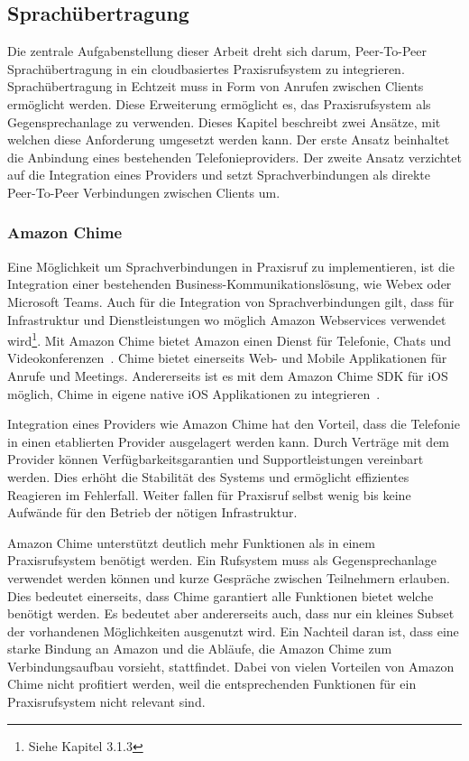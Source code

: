 \subsection{Sprachübertragung}

Die zentrale Aufgabenstellung dieser Arbeit dreht sich darum, Peer-To-Peer Sprachübertragung in ein cloudbasiertes Praxisrufsystem zu integrieren.
Sprachübertragung in Echtzeit muss in Form von Anrufen zwischen Clients ermöglicht werden.
Diese Erweiterung ermöglicht es, das Praxisrufsystem als Gegensprechanlage zu verwenden.
Dieses Kapitel beschreibt zwei Ansätze, mit welchen diese Anforderung umgesetzt werden kann.
Der erste Ansatz beinhaltet die Anbindung eines bestehenden Telefonieproviders.
Der zweite Ansatz verzichtet auf die Integration eines Providers und setzt Sprachverbindungen als direkte Peer-To-Peer Verbindungen zwischen Clients um.

\subsubsection{Amazon Chime}

Eine Möglichkeit um Sprachverbindungen in Praxisruf zu implementieren, ist die Integration einer bestehenden Business-Kommunikationslösung, wie Webex oder Microsoft Teams.
Auch für die Integration von Sprachverbindungen gilt, dass für Infrastruktur und Dienstleistungen wo möglich Amazon Webservices verwendet wird\footnote{Siehe Kapitel 3.1.3}.
Mit Amazon Chime bietet Amazon einen Dienst für Telefonie, Chats und Videokonferenzen~\cite{aws_chime}.
Chime bietet einerseits Web- und Mobile Applikationen für Anrufe und Meetings.
Andererseits ist es mit dem Amazon Chime SDK für iOS möglich, Chime in eigene native iOS Applikationen zu integrieren~\cite{aws_chime_sdk}.

Integration eines Providers wie Amazon Chime hat den Vorteil, dass die Telefonie in einen etablierten Provider ausgelagert werden kann.
Durch Verträge mit dem Provider können Verfügbarkeitsgarantien und Supportleistungen vereinbart werden.
Dies erhöht die Stabilität des Systems und ermöglicht effizientes Reagieren im Fehlerfall.
Weiter fallen für Praxisruf selbst wenig bis keine Aufwände für den Betrieb der nötigen Infrastruktur.

Amazon Chime unterstützt deutlich mehr Funktionen als in einem Praxisrufsystem benötigt werden.
Ein Rufsystem muss als Gegensprechanlage verwendet werden können und kurze Gespräche zwischen Teilnehmern erlauben.
Dies bedeutet einerseits, dass Chime garantiert alle Funktionen bietet welche benötigt werden.
Es bedeutet aber andererseits auch, dass nur ein kleines Subset der vorhandenen Möglichkeiten ausgenutzt wird.
Ein Nachteil daran ist, dass eine starke Bindung an Amazon und die Abläufe, die Amazon Chime zum Verbindungsaufbau vorsieht, stattfindet.
Dabei von vielen Vorteilen von Amazon Chime nicht profitiert werden, weil die entsprechenden Funktionen für ein Praxisrufsystem nicht relevant sind.

